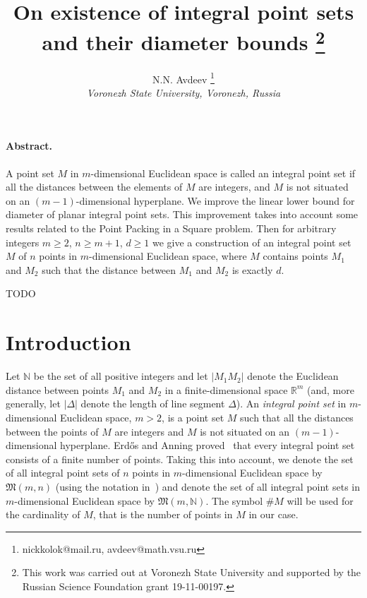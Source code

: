 \documentclass[a4paper,14pt]{article} %
\theoremstyle{plain}
\theoremstyle{definition}
\begin{document}

\title{
	On existence of integral point sets and their diameter bounds
	\footnote{
		This work was carried out at Voronezh State University and supported by the Russian Science
		Foundation grant 19-11-00197.
	}
}

\author{
	N.N. Avdeev
	\footnote{nickkolok@mail.ru, avdeev@math.vsu.ru}
	\\
	\textit{Voronezh State University, Voronezh, Russia}
}


\maketitle

\paragraph{Abstract.}
A point set $M$ in $m$-dimensional Euclidean space is called an integral point set if all the distances between the
elements of $M$ are integers, and $M$ is not situated on an $(m-1)$-dimensional hyperplane.
We improve the linear lower bound for diameter of planar integral point sets.
This improvement takes into account some results related to the Point Packing in a Square problem.
Then for arbitrary integers $m \geq 2$, $n \geq m+1$, $d \geq 1$
we give a construction of an integral point set $M$ of $n$ points in $m$-dimensional Euclidean space,
where $M$ contains points $M_1$ and $M_2$ such that the distance between $M_1$ and $M_2$ is exactly $d$.

TODO

\section{Introduction}
Let $\mathbb{N}$ be the set of all positive integers and let $|M_1 M_2|$ denote the Euclidean distance
between points $M_1$ and $M_2$ in a finite-dimensional space $\mathbb{R}^m$
(and, more generally, let $|\Delta|$ denote the length of line segment $\Delta$).
An \textit{integral point set} in $m$-dimensional Euclidean space, $m>2$, is a point set $M$ such that all the distances between the
points of $M$ are integers and $M$ is not situated on an $(m-1)$-dimensional hyperplane.
Erd{\H{o}}s and Anning proved~\cite{anning1945integral,erdos1945integral} that every integral point set consists of a finite number of points.
Taking this into account, we denote the set of all integral point sets of $n$ points in $m$-dimensional Euclidean space by
$\mathfrak{M}(m,n)$ (using the notation in~\cite{our-vmmsh-2018-translit})
and denote the set of all integral point sets in $m$-dimensional Euclidean space by $\mathfrak{M}(m,\mathbb{N})$.
The symbol $\# M$ will be used for the cardinality of $M$, that is the number of points in $M$ in our case.
\end{document}
